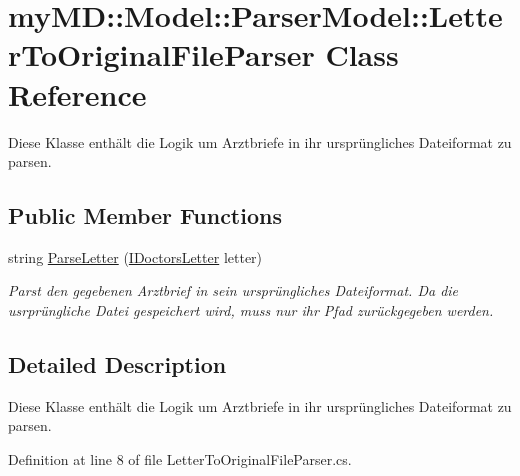 \hypertarget{classmy_m_d_1_1_model_1_1_parser_model_1_1_letter_to_original_file_parser}{
\section{my\-MD::Model::Parser\-Model::Letter\-To\-Original\-File\-Parser Class Reference}
\label{d3/dd9/classmy_m_d_1_1_model_1_1_parser_model_1_1_letter_to_original_file_parser}
}
Diese Klasse enth\"{a}lt die Logik um Arztbriefe in ihr urspr\"{u}ngliches Dateiformat zu parsen.  


\subsection*{Public Member Functions}
\begin{CompactItemize}
\item 
string \hyperlink{classmy_m_d_1_1_model_1_1_parser_model_1_1_letter_to_original_file_parser_cfcef4a63742991668d3a07e4562a2f6}{Parse\-Letter} (\hyperlink{interfacemy_m_d_1_1_model_interface_1_1_data_model_interface_1_1_i_doctors_letter}{IDoctors\-Letter} letter)
\begin{CompactList}\small\item\em Parst den gegebenen Arztbrief in sein urspr\"{u}ngliches Dateiformat. Da die usrpr\"{u}ngliche Datei gespeichert wird, muss nur ihr Pfad zur\"{u}ckgegeben werden. \item\end{CompactList}\end{CompactItemize}


\subsection{Detailed Description}
Diese Klasse enth\"{a}lt die Logik um Arztbriefe in ihr urspr\"{u}ngliches Dateiformat zu parsen. 



Definition at line 8 of file Letter\-To\-Original\-File\-Parser.cs.

